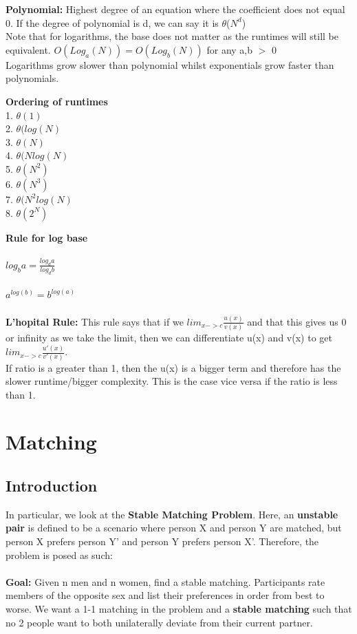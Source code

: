 \documentclass[11pt, oneside]{article}
\theoremstyle{definition}
\begin{document}
\textbf{Polynomial: }Highest degree of an equation where the coefficient does not equal 0. If the degree of polynomial is d, we can say it is $\theta$($N^d$)\\
Note that for logarithms, the base does not matter as the runtimes will still be equivalent. $O(Log_{a}(N)) = O(Log_{b}(N))$ for any a,b $>$ 0\\
Logarithms grow slower than polynomial whilst exponentials grow faster than polynomials.
\begin{center}
\textbf{Ordering of runtimes}\\
1. $\theta(1)$\\
2. $\theta(log(N)$\\
3. $\theta(N)$\\
4. $\theta(Nlog(N)$\\
5. $\theta(N^2)$\\
6. $\theta(N^3)$\\
7. $\theta(N^2 log(N)$\\
8. $\theta(2^N)$\\
\end{center}
\textbf{Rule for log base} \\\\
$log_b a = \frac{log_d a}{log_d b}$\\\\
$a^{log(b)}  = b^{log(a)}$\\\\
\textbf{L'hopital Rule: } This rule says that if we $lim_{x->c} \frac{u(x)}{v(x)}$ and that this gives us 0 or infinity as we take the limit, then we can differentiate u(x) and v(x) to get $lim_{x->c} \frac{u'(x)}{v'(x)}$.\\
If ratio is a greater than 1, then the u(x) is a bigger term and therefore has the slower runtime/bigger complexity. This is the case vice versa if the ratio is less than 1.\\
\newpage
\section{Matching}
\subsection{Introduction}
In particular, we look at the \textbf{Stable Matching Problem}. Here, an \textbf{unstable pair} is defined to be a scenario where person X and person Y are matched, but person X prefers person Y' and person Y prefers person X'. Therefore, the problem is posed as such:\\\\
\textbf{Goal:} Given n men and n women, find a stable matching. Participants rate members of the opposite sex and list their preferences in order from best to worse. We want a 1-1 matching in the problem and a \textbf{stable matching} such that no 2 people want to both unilaterally deviate from their current partner.
\end{document}
